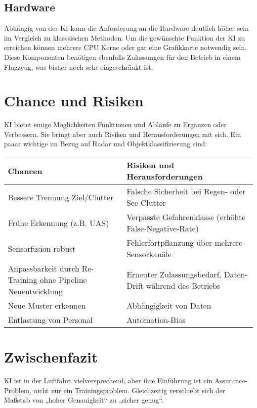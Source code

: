 \subsection{Hardware}
Abhängig von der KI kann die Anforderung an die Hardware deutlich höher sein im Vergleich zu klasssischen Methoden.
Um die gewünschte Funktion der KI zu erreichen können mehrere CPU Kerne oder gar eine Grafikkarte notwendig sein. 
Diese Komponenten benötigen ebenfalls Zulassungen für den Betrieb in einem Flugzeug, was bisher noch sehr eingeschränkt ist.

\section{Chance und Risiken}
KI bietet einige Möglichkeiten Funktionen und Abläufe zu Ergänzen oder Verbessern. Sie bringt aber 
auch Risiken und Herausforderungen mit sich. Ein paaar wichtige im Bezug auf Radar und Objektklassifizierung sind:

\begin{tabular}{p{} p{}}
\textbf{Chancen} & \textbf{Risiken und Herausforderungen} \\ \hline
Bessere Trennung Ziel/Clutter & Falsche Sicherheit bei Regen- oder See-Clutter \\[0.5em]

Frühe Erkennung (z.B. UAS) & Verpasste Gefahrenklasse (erhöhte False-Negative-Rate) \\[0.5em]

Sensorfusion robust & Fehlerfortpflanzung über mehrere Sensorkanäle \\[0.5em]

Anpassbarkeit durch Re-Training ohne Pipeline Neuentwicklung & Erneuter Zulassungsbedarf, Daten-Drift während des Betriebs \\[0.5em]

Neue Muster erkennen & Abhängigkeit von Daten\\[0.5em]

Entlastung von Personal & Automation-Bias\\
\end{tabular}

\section{Zwischenfazit}
KI ist in der Luftfahrt vielversprechend, aber ihre Einführung ist ein Assurance-Problem, nicht nur ein Trainingsproblem. 
Gleichzeitig verschiebt sich der Maßstab von „hoher Genauigkeit“ zu „sicher genug“.







